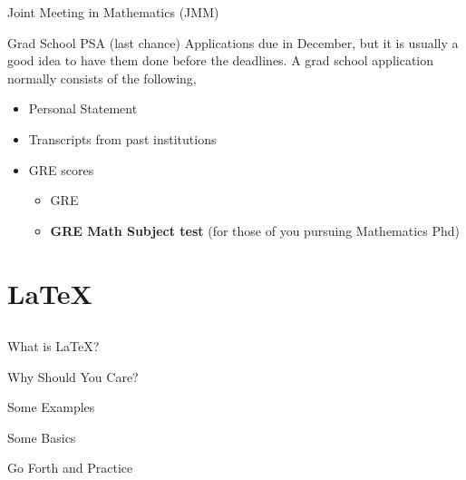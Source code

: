 \documentclass[xcolor=dvipsnames]{beamer}
\begin{document}
\begin{frame}{Joint Meeting in Mathematics (JMM)} 

\end{frame}

\begin{frame}{Grad School PSA (last chance)}
Applications due in December, but it is usually a good idea to have them done before the deadlines. A grad school application normally consists of the following, 
\begin{itemize}
\item Personal Statement
\item Transcripts from past institutions
\item GRE scores
\begin{itemize}
\item GRE 
\item \textbf{GRE Math Subject test }(for those of you pursuing Mathematics Phd) 

\end{itemize}
\end{itemize}
\end{frame}

\section{LaTeX}
\subsection{}

\begin{frame}{What is LaTeX?}

\end{frame}

\begin{frame}{Why Should You Care?}

\end{frame} 

\begin{frame}{Some Examples} 

\end{frame}

\begin{frame}{Some Basics} 

\end{frame}

\begin{frame}{Go Forth and Practice} 

\end{frame}
\end{document}
